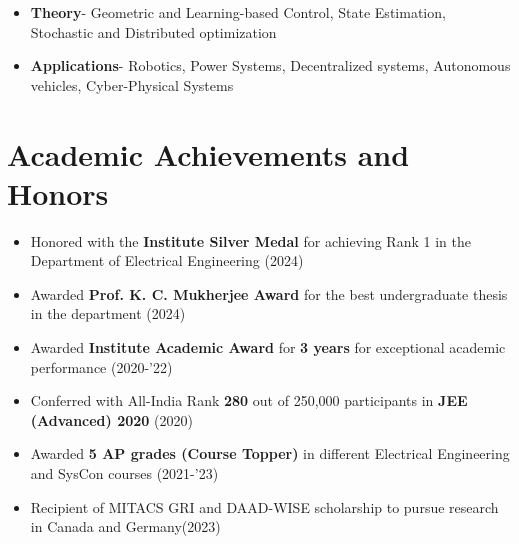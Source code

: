 \documentclass[10pt,letterpaper,sans]{moderncv}        %
\begin{document}
\begin{itemize}
    \item \textbf{Theory}- Geometric and Learning-based Control, State Estimation, Stochastic and Distributed optimization
    \item \textbf{Applications}- Robotics, Power Systems, Decentralized systems, Autonomous vehicles, Cyber-Physical Systems
\end{itemize}
\vspace{-0.25 cm}
\section{Academic Achievements and Honors}

\begin{itemize}
    \item Honored with the \textbf{Institute Silver Medal} for achieving Rank 1 in the Department of Electrical Engineering \hfill (2024)
    \item Awarded \textbf{Prof. K. C. Mukherjee Award} for the best undergraduate thesis in the department \hfill (2024)
    \item {Awarded \textbf{Institute Academic Award} for \textbf{3 years} for exceptional academic performance \hfill{{(2020-'22)}}} 
\item Conferred with All-India Rank \textbf{280} out of 250,000 participants in \textbf{JEE (Advanced) 2020} \hfill (2020)
\item Awarded \textbf{5 AP grades (Course Topper)} in different {Electrical Engineering and SysCon courses} \hfill (2021-'23)
\item Recipient of MITACS GRI and DAAD-WISE scholarship to pursue research in Canada and Germany\hfill (2023)
\end{itemize}
\end{document}
